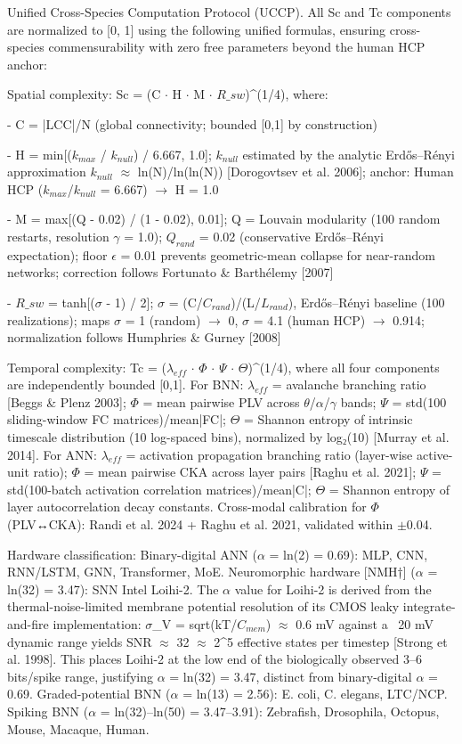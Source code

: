 \documentclass[a4paper,12pt]{article}
\begin{document}
Unified Cross-Species Computation Protocol (UCCP). All Sc and Tc components are normalized to [0, 1] using the following unified formulas, ensuring cross-species commensurability with zero free parameters beyond the human HCP anchor:


Spatial complexity: Sc = (C $\cdot$ H $\cdot$ M $\cdot$ $R\_{sw}$)^(1/4), where:


- C = |LCC|/N (global connectivity; bounded [0,1] by construction)


- H = min[($k_{max}$ / $k_{null}$) / 6.667, 1.0]; $k_{null}$ estimated by the analytic Erdős--Rényi approximation $k_{null}$ $\approx$ ln(N)/ln(ln(N)) [Dorogovtsev et al. 2006]; anchor: Human HCP ($k_{max}$/$k_{null}$ = 6.667) $\rightarrow$ H = 1.0


- M = max[(Q - 0.02) / (1 - 0.02), 0.01]; Q = Louvain modularity (100 random restarts, resolution $\gamma$ = 1.0); $Q_{rand}$ = 0.02 (conservative Erdős--Rényi expectation); floor $\epsilon$ = 0.01 prevents geometric-mean collapse for near-random networks; correction follows Fortunato \& Barthélemy [2007]


- $R\_{sw}$ = tanh[($\sigma$ - 1) / 2]; $\sigma$ = (C/$C_{rand}$)/(L/$L_{rand}$), Erdős--Rényi baseline (100 realizations); maps $\sigma$ = 1 (random) $\rightarrow$ 0, $\sigma$ = 4.1 (human HCP) $\rightarrow$ 0.914; normalization follows Humphries \& Gurney [2008]


Temporal complexity: Tc = ($\lambda_{eff}$ $\cdot$ $\Phi$ $\cdot$ $\Psi$ $\cdot$ $\Theta$)^(1/4), where all four components are independently bounded [0,1].
For BNN: $\lambda_{eff}$ = avalanche branching ratio [Beggs \& Plenz 2003]; $\Phi$ = mean pairwise PLV across $\theta$/$\alpha$/$\gamma$ bands; $\Psi$ = std(100 sliding-window FC matrices)/mean|FC|; $\Theta$ = Shannon entropy of intrinsic timescale distribution (10 log-spaced bins), normalized by log₂(10) [Murray et al. 2014].
For ANN: $\lambda_{eff}$ = activation propagation branching ratio (layer-wise active-unit ratio); $\Phi$ = mean pairwise CKA across layer pairs [Raghu et al. 2021]; $\Psi$ = std(100-batch activation correlation matrices)/mean|C|; $\Theta$ = Shannon entropy of layer autocorrelation decay constants.
Cross-modal calibration for $\Phi$ (PLV↔CKA): Randi et al. 2024 + Raghu et al. 2021, validated within $\pm$0.04.


Hardware classification: Binary-digital ANN ($\alpha$ = ln(2) = 0.69): MLP, CNN, RNN/LSTM, GNN, Transformer, MoE.
Neuromorphic hardware [NMH†] ($\alpha$ = ln(32) = 3.47): SNN Intel Loihi-2.
The $\alpha$ value for Loihi-2 is derived from the thermal-noise-limited membrane potential resolution of its CMOS leaky integrate-and-fire implementation: $\sigma$_V = sqrt(kT/$C_{mem}$) $\approx$ 0.6 mV against a ~20 mV dynamic range yields SNR $\approx$ 32 $\approx$ 2^5 effective states per timestep [Strong et al. 1998].
This places Loihi-2 at the low end of the biologically observed 3--6 bits/spike range, justifying $\alpha$ = ln(32) = 3.47, distinct from binary-digital $\alpha$ = 0.69.
Graded-potential BNN ($\alpha$ = ln(13) = 2.56): E. coli, C. elegans, LTC/NCP.
Spiking BNN ($\alpha$ = ln(32)--ln(50) = 3.47--3.91): Zebrafish, Drosophila, Octopus, Mouse, Macaque, Human.
\end{document}
